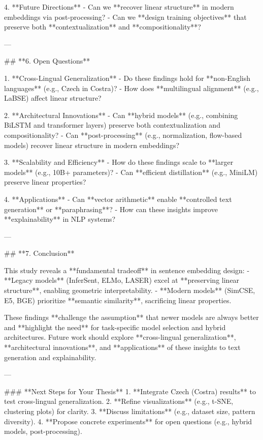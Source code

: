 4. **Future Directions**
   - Can we **recover linear structure** in modern embeddings via post-processing?
   - Can we **design training objectives** that preserve both **contextualization** and **compositionality**?

---

## **6. Open Questions**

1. **Cross-Lingual Generalization**
   - Do these findings hold for **non-English languages** (e.g., Czech in Costra)?
   - How does **multilingual alignment** (e.g., LaBSE) affect linear structure?

2. **Architectural Innovations**
   - Can **hybrid models** (e.g., combining BiLSTM and transformer layers) preserve both contextualization and compositionality?
   - Can **post-processing** (e.g., normalization, flow-based models) recover linear structure in modern embeddings?

3. **Scalability and Efficiency**
   - How do these findings scale to **larger models** (e.g., 10B+ parameters)?
   - Can **efficient distillation** (e.g., MiniLM) preserve linear properties?

4. **Applications**
   - Can **vector arithmetic** enable **controlled text generation** or **paraphrasing**?
   - How can these insights improve **explainability** in NLP systems?

---

## **7. Conclusion**

This study reveals a **fundamental tradeoff** in sentence embedding design:
- **Legacy models** (InferSent, ELMo, LASER) excel at **preserving linear structure**, enabling geometric interpretability.
- **Modern models** (SimCSE, E5, BGE) prioritize **semantic similarity**, sacrificing linear properties.

These findings **challenge the assumption** that newer models are always better and **highlight the need** for task-specific model selection and hybrid architectures. Future work should explore **cross-lingual generalization**, **architectural innovations**, and **applications** of these insights to text generation and explainability.

---

### **Next Steps for Your Thesis**
1. **Integrate Czech (Costra) results** to test cross-lingual generalization.
2. **Refine visualizations** (e.g., t-SNE, clustering plots) for clarity.
3. **Discuss limitations** (e.g., dataset size, pattern diversity).
4. **Propose concrete experiments** for open questions (e.g., hybrid models, post-processing).

